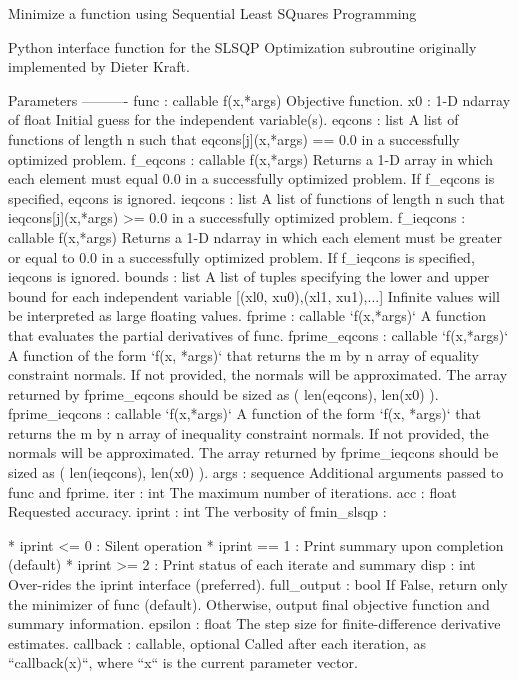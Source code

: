 \begin{DoxyVerb}Minimize a function using Sequential Least SQuares Programming

Python interface function for the SLSQP Optimization subroutine
originally implemented by Dieter Kraft.

Parameters
----------
func : callable f(x,*args)
    Objective function.
x0 : 1-D ndarray of float
    Initial guess for the independent variable(s).
eqcons : list
    A list of functions of length n such that
    eqcons[j](x,*args) == 0.0 in a successfully optimized
    problem.
f_eqcons : callable f(x,*args)
    Returns a 1-D array in which each element must equal 0.0 in a
    successfully optimized problem.  If f_eqcons is specified,
    eqcons is ignored.
ieqcons : list
    A list of functions of length n such that
    ieqcons[j](x,*args) >= 0.0 in a successfully optimized
    problem.
f_ieqcons : callable f(x,*args)
    Returns a 1-D ndarray in which each element must be greater or
    equal to 0.0 in a successfully optimized problem.  If
    f_ieqcons is specified, ieqcons is ignored.
bounds : list
    A list of tuples specifying the lower and upper bound
    for each independent variable [(xl0, xu0),(xl1, xu1),...]
    Infinite values will be interpreted as large floating values.
fprime : callable `f(x,*args)`
    A function that evaluates the partial derivatives of func.
fprime_eqcons : callable `f(x,*args)`
    A function of the form `f(x, *args)` that returns the m by n
    array of equality constraint normals.  If not provided,
    the normals will be approximated. The array returned by
    fprime_eqcons should be sized as ( len(eqcons), len(x0) ).
fprime_ieqcons : callable `f(x,*args)`
    A function of the form `f(x, *args)` that returns the m by n
    array of inequality constraint normals.  If not provided,
    the normals will be approximated. The array returned by
    fprime_ieqcons should be sized as ( len(ieqcons), len(x0) ).
args : sequence
    Additional arguments passed to func and fprime.
iter : int
    The maximum number of iterations.
acc : float
    Requested accuracy.
iprint : int
    The verbosity of fmin_slsqp :

    * iprint <= 0 : Silent operation
    * iprint == 1 : Print summary upon completion (default)
    * iprint >= 2 : Print status of each iterate and summary
disp : int
    Over-rides the iprint interface (preferred).
full_output : bool
    If False, return only the minimizer of func (default).
    Otherwise, output final objective function and summary
    information.
epsilon : float
    The step size for finite-difference derivative estimates.
callback : callable, optional
    Called after each iteration, as ``callback(x)``, where ``x`` is the
    current parameter vector.


\end{DoxyVerb}
